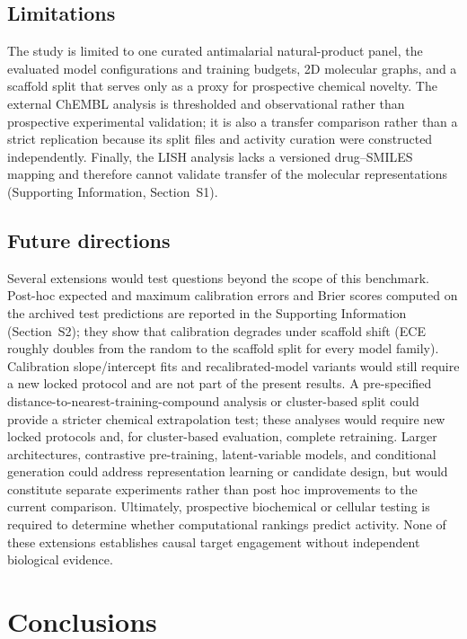 \documentclass[11pt,a4paper]{article}
\begin{document}
\subsection{Limitations}

The study is limited to one curated antimalarial natural-product panel, the evaluated model configurations and training budgets, 2D molecular graphs, and a scaffold split that serves only as a proxy for prospective chemical novelty. The external ChEMBL analysis is thresholded and observational rather than prospective experimental validation; it is also a transfer comparison rather than a strict replication because its split files and activity curation were constructed independently. Finally, the LISH analysis lacks a versioned drug--SMILES mapping and therefore cannot validate transfer of the molecular representations (Supporting Information, Section~S1).

\subsection{Future directions}

Several extensions would test questions beyond the scope of this benchmark. Post-hoc expected and maximum calibration errors and Brier scores computed on the archived test predictions are reported in the Supporting Information (Section~S2); they show that calibration degrades under scaffold shift (ECE roughly doubles from the random to the scaffold split for every model family). Calibration slope/intercept fits and recalibrated-model variants would still require a new locked protocol and are not part of the present results. A pre-specified distance-to-nearest-training-compound analysis or cluster-based split could provide a stricter chemical extrapolation test; these analyses would require new locked protocols and, for cluster-based evaluation, complete retraining. Larger architectures, contrastive pre-training, latent-variable models, and conditional generation could address representation learning or candidate design, but would constitute separate experiments rather than post hoc improvements to the current comparison. Ultimately, prospective biochemical or cellular testing is required to determine whether computational rankings predict activity. None of these extensions establishes causal target engagement without independent biological evidence.

\section{Conclusions}
\end{document}
